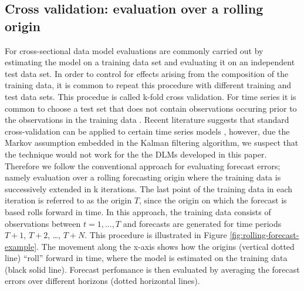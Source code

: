 \documentclass[12pt, a4paper]{article}
\begin{document}
\subsection{Cross validation: evaluation over a rolling
origin}\label{cross-validation-evaluation-over-a-rolling-origin}

For cross-sectional data model evaluations are commonly carried out by
estimating the model on a training data set and evaluating it on an
independent test data set. In order to control for effects arising from
the composition of the training data, it is common to repeat this
procedure with different training and test data sets. This procedue is called k-fold cross validation. For time series it is common to choose a test set that
does not contain observations occuring prior to the observations in the
training data \citep{bergmeir2012use}. Recent literature suggests that
standard cross-validation can be applied to certain time series models
\citep{bergmeir2018}, however, due the Markov assumption embedded in the
Kalman filtering algorithm, we suspect that the technique would not work
for the the DLMs developed in this paper. Therefore
we follow the conventional approach for evaluating forecast errors;
namely evaluation over a rolling forecasting origin
\citep{tashman2000out} where the training data is successively extended in k iterations. The last point of the training data in each iteration is referred to as the origin $T$, since the origin on which the forecast is based rolls forward in time.
In this approach, the training data consists of observations between
$t = 1, ..., T$ and forecasts are generated for time periods $T+1$,
$T+2$, \ldots{}, $T+N$. This procedure is illustrated in Figure
\ref{fig:rolling-forecast-example}. The movement along the x-axis shows
how the origins (vertical dotted line) ``roll'' forward in time, where
the model is estimated on the training data (black solid line). Forecast perfomance is then evaluated by averaging the forecast errors
over different horizons (dotted horizontal lines).
\end{document}

